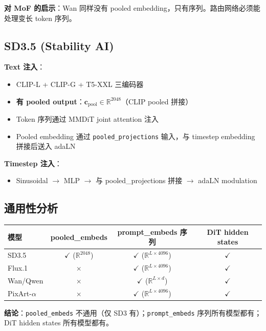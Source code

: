 \documentclass[11pt,a4paper]{article}
\newcommand{\R}{\mathbb{R}}
\theoremstyle{definition}
\begin{document}
\textbf{对 MoF 的启示}：Wan 同样没有 pooled embedding，只有序列。路由网络必须能处理变长 token 序列。

\subsection{SD3.5 (Stability AI)}

\textbf{Text 注入}：
\begin{itemize}
    \item CLIP-L + CLIP-G + T5-XXL 三编码器
    \item \textbf{有 pooled output}：$\mathbf{c}_{\text{pool}} \in \R^{2048}$（CLIP pooled 拼接）
    \item Token 序列通过 MMDiT joint attention 注入
    \item Pooled embedding 通过 \texttt{pooled\_projections} 输入，与 timestep embedding 拼接后送入 adaLN
\end{itemize}

\textbf{Timestep 注入}：
\begin{itemize}
    \item Sinusoidal $\to$ MLP $\to$ 与 pooled\_projections 拼接 $\to$ adaLN modulation
\end{itemize}

\subsection{通用性分析}

\begin{center}
\begin{tabular}{lccc}
\toprule
\textbf{模型} & \textbf{pooled\_embeds} & \textbf{prompt\_embeds 序列} & \textbf{DiT hidden states} \\
\midrule
SD3.5 & $\checkmark$ ($\R^{2048}$) & $\checkmark$ ($\R^{L \times 4096}$) & $\checkmark$ \\
Flux.1 & $\times$ & $\checkmark$ ($\R^{L \times 4096}$) & $\checkmark$ \\
Wan/Qwen & $\times$ & $\checkmark$ ($\R^{L \times d}$) & $\checkmark$ \\
PixArt-$\alpha$ & $\times$ & $\checkmark$ ($\R^{L \times 4096}$) & $\checkmark$ \\
\bottomrule
\end{tabular}
\end{center}

\textbf{结论}：\texttt{pooled\_embeds} 不通用（仅 SD3 有）；\texttt{prompt\_embeds} 序列所有模型都有；DiT hidden states 所有模型都有。
\end{document}

